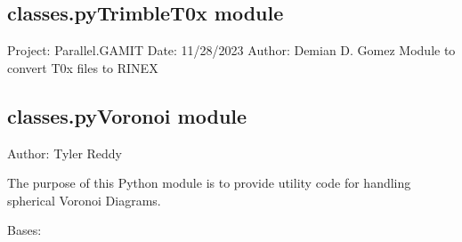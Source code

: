 \documentclass[letterpaper,10pt,english]{sphinxmanual}
\begin{document}
\subsection{classes.pyTrimbleT0x module}
\label{\detokenize{classes:module-classes.pyTrimbleT0x}}\label{\detokenize{classes:classes-pytrimblet0x-module}}
\sphinxAtStartPar
Project: Parallel.GAMIT
Date: 11/28/2023
Author: Demian D. Gomez
Module to convert T0x files to RINEX

\begin{fulllineitems}
\label{\detokenize{classes:classes.pyTrimbleT0x.convert_trimble}}
\pysigstartsignatures
{}
\pysigstopsignatures
\end{fulllineitems}



\subsection{classes.pyVoronoi module}
\label{\detokenize{classes:module-classes.pyVoronoi}}\label{\detokenize{classes:classes-pyvoronoi-module}}
\sphinxAtStartPar
Author: Tyler Reddy

\sphinxAtStartPar
The purpose of this Python module is to provide utility code for handling spherical Voronoi Diagrams.

\begin{fulllineitems}
\label{\detokenize{classes:classes.pyVoronoi.IntersectionError}}
\pysigstartsignatures
{}
\pysigstopsignatures
\sphinxAtStartPar
Bases: 

\end{fulllineitems}
\end{document}

